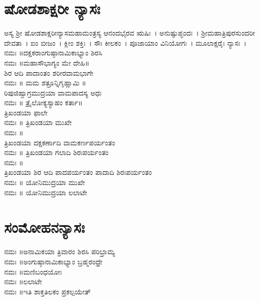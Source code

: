 \section{ಷೋಡಶಾಕ್ಷರೀ ನ್ಯಾಸಃ}
ಅಸ್ಯ ಶ್ರೀ ಷೋಡಶಾಕ್ಷರೀನ್ಯಾಸಮಹಾಮಂತ್ರಸ್ಯ ಆನಂದಭೈರವ ಋಷಿಃ~। ಅನುಷ್ಟುಪ್ಛಂದಃ~। ಶ್ರೀಮಹಾತ್ರಿಪುರಸುಂದರೀ ದೇವತಾ~। ಐಂ ಬೀಜಂ~। ಕ್ಲೀಂ ಶಕ್ತಿಃ~। ಸೌಃ ಕೀಲಕಂ~। ಪೂಜಾಯಾಂ ವಿನಿಯೋಗಃ~। ಮೂಲಾಕ್ಷರೈಃ ನ್ಯಾಸಃ~।\\
 ನಮಃ ॥ದಕ್ಷಕರಾಂಗುಷ್ಠಾನಾಮಿಕಾಭ್ಯಾಂ ಶಿರಸಿ\\
 ನಮಃ ॥ಮಹಾಸೌಭಾಗ್ಯಂ ಮೇ ದೇಹಿ॥\\ಶಿರ ಆದಿ ಪಾದಾಂತಂ ಶರೀರವಾಮಭಾಗೇ\\
 ನಮಃ ॥ ಮಮ ಶತ್ರೂನ್ನಿಗೃಹ್ಣಾಮಿ ॥\\ರಿಪುಜಿಹ್ವಾಗ್ರಮುದ್ರಯಾ ವಾಮಪಾದಸ್ಯ ಅಧಃ\\
 ನಮಃ ॥ ತ್ರೈಲೋಕ್ಯಸ್ಯಾಹಂ ಕರ್ತಾ॥\\ತ್ರಿಖಂಡಯಾ ಫಾಲೇ\\
 ನಮಃ ॥ ತ್ರಿಖಂಡಯಾ ಮುಖೇ\\
 ನಮಃ ॥\\ ತ್ರಿಖಂಡಯಾ ದಕ್ಷಕರ್ಣಾದಿ ವಾಮಕರ್ಣಪರ್ಯಂತಂ\\
 ನಮಃ ॥ ತ್ರಿಖಂಡಯಾ ಗಲಾದಿ ಶಿರಃಪರ್ಯಂತಂ\\
 ನಮಃ ॥\\ ತ್ರಿಖಂಡಯಾ ಶಿರ ಆದಿ ಪಾದಪರ್ಯಂತಂ ಪಾದಾದಿ ಶಿರಃಪರ್ಯಂತಂ\\
 ನಮಃ ॥ ಯೋನಿಮುದ್ರಯಾ ಮುಖೇ\\
 ನಮಃ ॥ ಯೋನಿಮುದ್ರಯಾ ಲಲಾಟೇ
\section{ಸಂಮೋಹನನ್ಯಾಸಃ}
 ನಮಃ ॥ಅನಾಮಿಕಯಾ ತ್ರಿವಾರಂ ಶಿರಸಿ ಪರಿಭ್ರಾಮ್ಯ\\
 ನಮಃ ॥ಅಂಗುಷ್ಠಾನಾಮಿಕಾಭ್ಯಾಂ ಬ್ರಹ್ಮರಂಧ್ರೇ\\
 ನಮಃ ॥ಮಣಿಬಂಧಯೋಃ\\
 ನಮಃ ॥ಲಲಾಟೇ\\
 ನಮಃ ॥ಇತಿ ಶಾಕ್ತತಿಲಕಂ ಪ್ರಕಲ್ಪಯೇತ್

